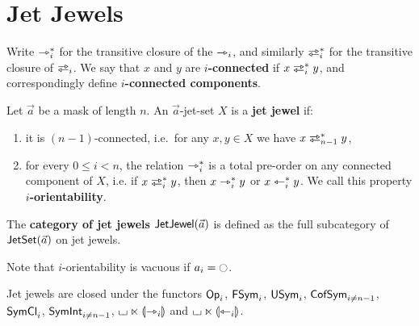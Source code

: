 \documentclass[a4paper]{memoir}
\begin{document}
\section{Jet Jewels} \label{sec:jetjewel}
Write $\rightarrowtriangle_i^*$ for the transitive closure of the $\rightarrowtriangle_i$, and similarly $\infrajet_i^*$ for the transitive closure of $\infrajet_i$.
We say that $x$ and $y$ are \textbf{$i$-connected} if $x \infrajet_i^* y$, and correspondingly define \textbf{$i$-connected components}.
\begin{definition} \label{def:jet-jewel}
	Let $\vec a$ be a mask of length $n$.
	An $\vec a$-jet-set $X$ is a \textbf{jet jewel} if:
	\begin{enumerate}
		\item it is $(n-1)$-connected, i.e.\ for any $x, y \in X$ we have $x \infrajet_{n-1}^* y$,
		\item for every $0 \leq i < n$, the relation $\rightarrowtriangle_i^*$ is a total pre-order on any connected component of $X$, i.e. if $x \infrajet_i^* y$, then $x \rightarrowtriangle_i^* y$ or $x \leftarrowtriangle_i^* y$. We call this property \textbf{$i$-orientability}.
	\end{enumerate}
	The \textbf{category of jet jewels} $\mathsf{JetJewel}(\vec a)$ is defined as the full subcategory of $\mathsf{JetSet}(\vec a)$ on jet jewels.
\end{definition}
Note that $i$-orientability is vacuous if $a_i = \npolar$.
\begin{proposition} \label{thm:lift-to-jet-jewels}
	Jet jewels are closed under the functors ${\mathsf{Op}}_i$, $\mathsf{FSym}_i$, $\mathsf{USym}_i$, $\mathsf{CofSym}_{i \neq n-1}$, $\mathsf{SymCl}_i$, $\mathsf{SymInt}_{i \neq n-1}$, ${\llcorner\hspace{-.4ex}\lrcorner} \ltimes {\llparenthesis \rightarrowtriangle_i \rrparenthesis}$ and ${\llcorner\hspace{-.4ex}\lrcorner} \ltimes {\llparenthesis \leftarrowtriangle_i \rrparenthesis}$.
\end{proposition}
\end{document}

